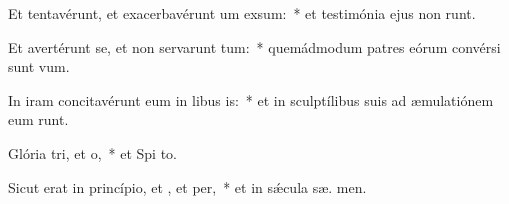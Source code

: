 \item Et tentavérunt, et exacerbavérunt um exsum:~* et testimónia ejus non runt.
\item Et avertérunt se, et non servarunt tum:~* quemádmodum patres eórum convérsi sunt   vum.
\item In iram concitavérunt eum in libus is:~* et in sculptílibus suis ad æmulatiónem eum runt.
\item Glória tri, et o,~* et Spi to.
\item Sicut erat in princípio, et , et per,~* et in sǽcula sæ. men.
